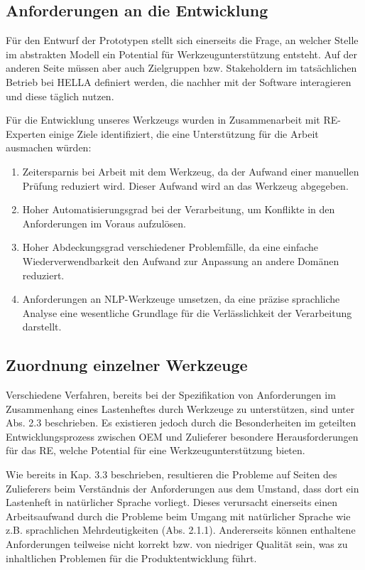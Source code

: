 \documentclass[12pt]{report}
\begin{document}
\subsection{Anforderungen an die Entwicklung}
Für den Entwurf der Prototypen stellt sich einerseits die Frage, an welcher Stelle im abstrakten Modell ein Potential für Werkzeugunterstützung entsteht. Auf der anderen Seite müssen aber auch Zielgruppen bzw. Stakeholdern im tatsächlichen Betrieb bei HELLA definiert werden, die nachher mit der Software interagieren und diese täglich nutzen.

Für die Entwicklung unseres Werkzeugs wurden in Zusammenarbeit mit RE-Experten einige Ziele identifiziert, die eine Unterstützung für die Arbeit ausmachen würden:
\begin{enumerate}
\item Zeitersparnis bei Arbeit mit dem Werkzeug, da der Aufwand einer manuellen Prüfung reduziert wird. Dieser Aufwand wird an das Werkzeug abgegeben.
\item Hoher Automatisierungsgrad bei der Verarbeitung, um Konflikte in den Anforderungen im Voraus aufzulösen.
\item Hoher Abdeckungsgrad verschiedener Problemfälle, da eine einfache Wiederverwendbarkeit den Aufwand zur Anpassung an andere Domänen reduziert.
\item Anforderungen an NLP-Werkzeuge umsetzen, da eine präzise sprachliche Analyse eine wesentliche Grundlage für die Verlässlichkeit der Verarbeitung darstellt.
\end{enumerate}

\subsection{Zuordnung einzelner Werkzeuge}
Verschiedene Verfahren, bereits bei der Spezifikation von Anforderungen im Zusammenhang eines Lastenheftes durch Werkzeuge zu unterstützen, sind unter Abs. 2.3 beschrieben. Es existieren jedoch durch die Besonderheiten im geteilten Entwicklungsprozess zwischen OEM und Zulieferer besondere Herausforderungen für das RE, welche Potential für eine Werkzeugunterstützung bieten. 

Wie bereits in Kap. 3.3 beschrieben, resultieren die Probleme auf Seiten des Zulieferers beim Verständnis der Anforderungen aus dem Umstand, dass dort ein Lastenheft in natürlicher Sprache vorliegt. Dieses verursacht einerseits einen Arbeitsaufwand durch die Probleme beim Umgang mit natürlicher Sprache wie z.B. sprachlichen Mehrdeutigkeiten (Abs. 2.1.1). Andererseits können enthaltene Anforderungen teilweise nicht korrekt bzw. von niedriger Qualität sein, was zu inhaltlichen Problemen für die Produktentwicklung führt. 
\end{document}
